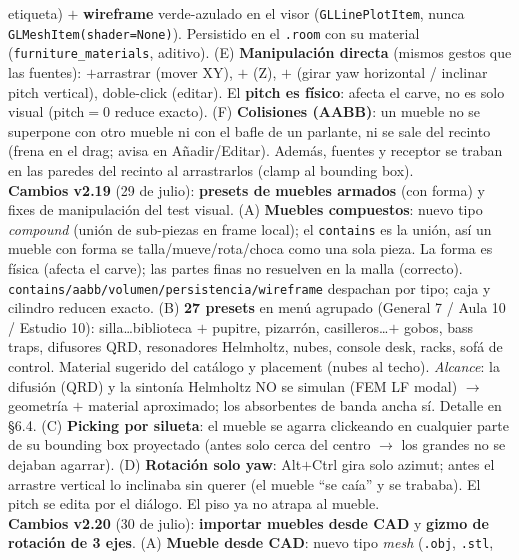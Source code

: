\documentclass[11pt, a4paper]{article}
\newcommand{\tecla}[1]{\texttt{\small\fbox{#1}}}
\begin{document}
\begin{center}
{    etiqueta) $+$ \textbf{wireframe} verde-azulado en el visor
    (\texttt{GLLinePlotItem}, nunca \texttt{GLMeshItem(shader=None)}). Persistido
    en el \texttt{.room} con su material (\texttt{furniture\_materials}, aditivo).
    (E) \textbf{Manipulación directa} (mismos gestos que las fuentes):
    \tecla{Shift}$+$arrastrar (mover XY), \tecla{Ctrl}$+$\tecla{Shift} (Z),
    \tecla{Alt}$+$\tecla{Ctrl} (girar yaw horizontal / inclinar pitch vertical),
    doble-click (editar). El \textbf{pitch es físico}: afecta el carve, no es solo
    visual (pitch$=0$ reduce exacto).
    (F) \textbf{Colisiones (AABB)}: un mueble no se superpone con otro mueble ni
    con el bafle de un parlante, ni se sale del recinto (frena en el drag; avisa
    en Añadir/Editar). Además, fuentes y receptor se traban en las paredes del
    recinto al arrastrarlos (clamp al bounding box).\\[2pt]
    \textbf{Cambios v2.19} (29 de julio): \textbf{presets de muebles armados}
    (con forma) y fixes de manipulación del test visual.
    (A) \textbf{Muebles compuestos}: nuevo tipo \emph{compound} (unión de
    sub-piezas en frame local); el \texttt{contains} es la unión, así un mueble
    con forma se talla/mueve/rota/choca como una sola pieza. La forma es física
    (afecta el carve); las partes finas no resuelven en la malla (correcto).
    \texttt{contains/aabb/volumen/persistencia/wireframe} despachan por tipo;
    caja y cilindro reducen exacto.
    (B) \textbf{27 presets} en menú agrupado (General 7 / Aula 10 / Estudio 10):
    silla\ldots biblioteca $+$ pupitre, pizarrón, casilleros\ldots $+$ gobos,
    bass traps, difusores QRD, resonadores Helmholtz, nubes, console desk, racks,
    sofá de control. Material sugerido del catálogo y placement (nubes al techo).
    \emph{Alcance}: la difusión (QRD) y la sintonía Helmholtz NO se simulan (FEM
    LF modal) $\to$ geometría $+$ material aproximado; los absorbentes de banda
    ancha sí. Detalle en \S6.4.
    (C) \textbf{Picking por silueta}: el mueble se agarra clickeando en cualquier
    parte de su bounding box proyectado (antes solo cerca del centro $\to$ los
    grandes no se dejaban agarrar).
    (D) \textbf{Rotación solo yaw}: Alt$+$Ctrl gira solo azimut; antes el arrastre
    vertical lo inclinaba sin querer (el mueble ``se caía'' y se trababa). El
    pitch se edita por el diálogo. El piso ya no atrapa al mueble.\\[2pt]
    \textbf{Cambios v2.20} (30 de julio): \textbf{importar muebles desde CAD} y
    \textbf{gizmo de rotación de 3 ejes}.
    (A) \textbf{Mueble desde CAD}: nuevo tipo \emph{mesh} (\texttt{.obj}, \texttt{.stl},
}
\end{center}
\end{document}
